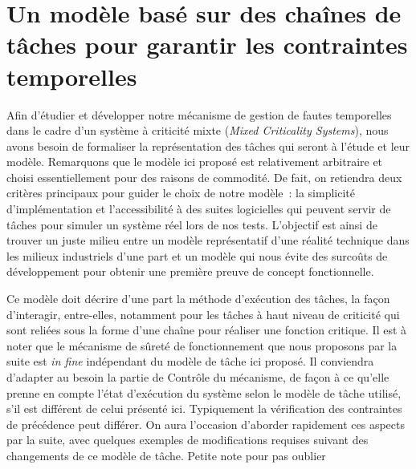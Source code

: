 \documentclass[french, a4paper, 11pt, twoside, pdftex]{StyleThese}
\begin{document}

\section{Un modèle basé sur des chaînes de tâches pour garantir les contraintes temporelles}

    
    Afin d'étudier et développer notre mécanisme de gestion de fautes temporelles dans le cadre d'un système à criticité mixte (\textit{Mixed Criticality Systems}), nous avons besoin de formaliser la représentation des tâches qui seront à l'étude et leur modèle. Remarquons que le modèle ici proposé est relativement arbitraire et choisi essentiellement pour des raisons de commodité. De fait, on retiendra deux critères principaux pour guider le choix de notre modèle~: la simplicité d'implémentation et l'accessibilité à des suites logicielles qui peuvent servir de tâches pour simuler un système réel lors de nos tests. L'objectif est ainsi de trouver un juste milieu entre un modèle représentatif d'une réalité technique dans les milieux industriels d'une part et un modèle qui nous évite des surcoûts de développement pour obtenir une première preuve de concept fonctionnelle.
    
    
    Ce modèle doit décrire d'une part la méthode d'exécution des tâches, la façon d'interagir, entre-elles, notamment pour les tâches à haut niveau de criticité qui sont reliées sous la forme d'une chaîne pour réaliser une fonction critique. Il est à noter que le mécanisme de sûreté de fonctionnement que nous proposons par la suite est \textit{in fine} indépendant du modèle de tâche ici proposé. Il conviendra d'adapter au besoin la partie de Contrôle du mécanisme, de façon à ce qu'elle prenne en compte l'état d'exécution du système selon le modèle de tâche utilisé, s'il est différent de celui présenté ici. Typiquement la vérification des contraintes de précédence peut différer. On aura l'occasion d'aborder rapidement ces aspects par la suite, avec quelques exemples de modifications requises suivant des changements de ce modèle de tâche. \alert{Petite note pour pas oublier}
    
\end{document}
